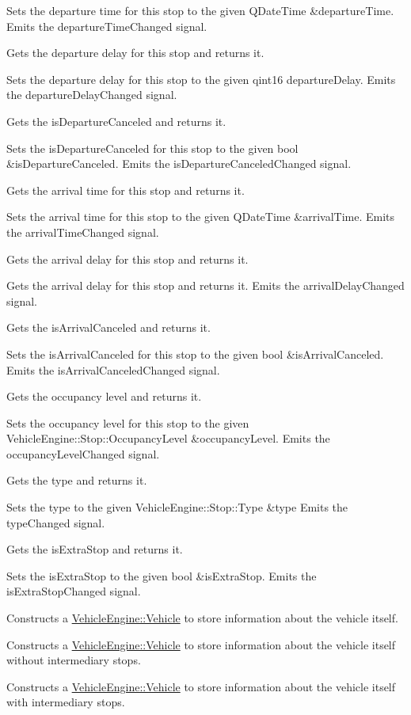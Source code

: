 Sets the departure time for this stop to the given Q\+Date\+Time \&departure\+Time. Emits the departure\+Time\+Changed signal.

Gets the departure delay for this stop and returns it.

Sets the departure delay for this stop to the given qint16 departure\+Delay. Emits the departure\+Delay\+Changed signal.

Gets the is\+Departure\+Canceled and returns it.

Sets the is\+Departure\+Canceled for this stop to the given bool \&is\+Departure\+Canceled. Emits the is\+Departure\+Canceled\+Changed signal.

Gets the arrival time for this stop and returns it.

Sets the arrival time for this stop to the given Q\+Date\+Time \&arrival\+Time. Emits the arrival\+Time\+Changed signal.

Gets the arrival delay for this stop and returns it.

Gets the arrival delay for this stop and returns it. Emits the arrival\+Delay\+Changed signal.

Gets the is\+Arrival\+Canceled and returns it.

Sets the is\+Arrival\+Canceled for this stop to the given bool \&is\+Arrival\+Canceled. Emits the is\+Arrival\+Canceled\+Changed signal.

Gets the occupancy level and returns it.

Sets the occupancy level for this stop to the given Vehicle\+Engine\+::\+Stop\+::\+Occupancy\+Level \&occupancy\+Level. Emits the occupancy\+Level\+Changed signal.

Gets the type and returns it.

Sets the type to the given Vehicle\+Engine\+::\+Stop\+::\+Type \&type Emits the type\+Changed signal.

Gets the is\+Extra\+Stop and returns it.

Sets the is\+Extra\+Stop to the given bool \&is\+Extra\+Stop. Emits the is\+Extra\+Stop\+Changed signal.

Constructs a \mbox{\hyperlink{classVehicleEngine_1_1Vehicle}{Vehicle\+Engine\+::\+Vehicle}} to store information about the vehicle itself.

Constructs a \mbox{\hyperlink{classVehicleEngine_1_1Vehicle}{Vehicle\+Engine\+::\+Vehicle}} to store information about the vehicle itself without intermediary stops.

Constructs a \mbox{\hyperlink{classVehicleEngine_1_1Vehicle}{Vehicle\+Engine\+::\+Vehicle}} to store information about the vehicle itself with intermediary stops.

